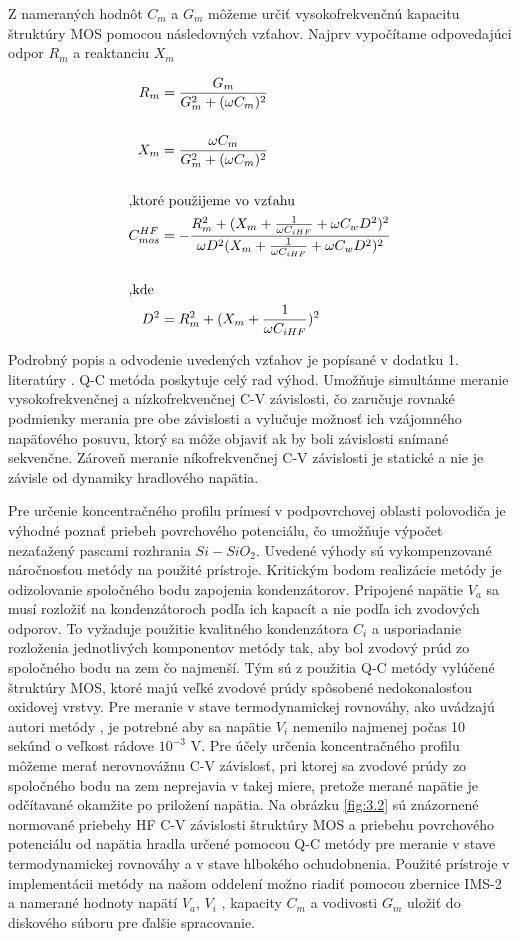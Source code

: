 Z nameraných hodnôt $C_m$ a $G_m$ môžeme určiť vysokofrekvenčnú
kapacitu štruktúry MOS pomocou následovných vzťahov.  Najprv
vypočítame odpovedajúci odpor $R_m$ a reaktanciu $X_m$

\begin{subequations}\label{eq:3.3}
\begin{align}
R_m &= \frac{G_m}{G^2_m + (\omega C_m)^2}\label{subeq:3.3a}\\[0.5cm]
X_m &= \frac{\omega C_m}{G^2_m + (\omega C_m)^2}\label{subeq:3.3b}\\[0.5cm]
\intertext{,ktoré použijeme vo vzťahu}
C^{HF}_{mos} &= - \frac{R^2_m + (X_m + \frac{1}{\omega C_{iHF}} + \omega C_w D^2)^2}{\omega D^2(X_m + \frac{1}{\omega C_{iHF}} + \omega C_w D^2)^2}\label{subeq:3.3c}\\[0.5cm]
\intertext{,kde}
D^2 &= R^2_m + (X_m + \frac{1}{\omega C_{iHF}})^2\label{subeq:3.3d}
\end{align}
\end{subequations}

Podrobný popis a odvodenie uvedených vzťahov je popísané v dodatku
1. literatúry \cite{3.6}. Q-C metóda poskytuje celý rad výhod.
Umožňuje simultánne meranie vysokofrekvenčnej a nízkofrekvenčnej C-V
závislosti, čo zaručuje rovnaké podmienky merania pre obe závislosti a
vylučuje možnosť ich vzájomného napäťového posuvu, ktorý sa môže
objaviť ak by boli závislosti snímané sekvenčne.  Zároveň meranie
níkofrekvenčnej C-V závislosti je statické a nie je závisle od
dynamiky hradlového napätia.

Pre určenie koncentračného profilu prímesí v podpovrchovej oblasti
polovodiča je výhodné poznať priebeh povrchového potenciálu, čo
umožňuje výpočet nezaťažený pascami rozhrania $Si-SiO_2$. Uvedené
výhody sú vykompenzované náročnosťou metódy na použité prístroje.
Kritickým bodom realizácie metódy je odizolovanie spoločného bodu
zapojenia kondenzátorov. Pripojené napätie $V_a$ sa musí rozložiť na
kondenzátoroch podľa ich kapacít a nie podľa ich zvodových odporov.
To vyžaduje použitie kvalitného kondenzátora $C_i$ a usporiadanie
rozloženia jednotlivých komponentov metódy tak, aby bol zvodový prúd
zo spoločného bodu na zem čo najmenší. Tým sú z použitia Q-C metódy
vylúčené štruktúry MOS, ktoré majú veľké zvodové prúdy spôsobené
nedokonalosťou oxidovej vrstvy. Pre meranie v stave termodynamickej
rovnováhy, ako uvádzajú autori metódy \cite{3.7}, je potrebné aby sa
napätie $V_i$ nemenilo najmenej počas 10 sekúnd o veľkost rádove
$10^{-3}$ V. Pre účely určenia koncentračného profilu môžeme merať
nerovnovážnu C-V závislosť, pri ktorej sa zvodové prúdy zo spoločného
bodu na zem neprejavia v takej miere, pretože merané napätie je
odčítavané okamžite po priložení napätia. Na obrázku \ref{fig:3.2} sú
znázornené normované priebehy HF C-V závislosti štruktúry MOS a
priebehu povrchového potenciálu od napätia hradla určené pomocou Q-C
metódy pre meranie v stave termodynamickej rovnováhy a v stave
hlbokého ochudobnenia. Použité prístroje v implementácii metódy na
našom oddelení \cite{3.8,3.9} možno riadiť pomocou zbernice IMS-2 a
namerané hodnoty napätí $V_a$, $V_i$ , kapacity $C_m$ a vodivosti
$G_m$ uložiť do diskového súboru pre ďalšie spracovanie.

